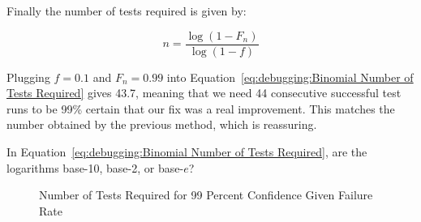 Finally the number of tests required is given by:

\begin{equation}
	n = \frac{\log\left(1 - F_n\right)}{\log\left(1 - f\right)}
\label{eq:debugging:Binomial Number of Tests Required}
\end{equation}

Plugging $f=0.1$ and $F_n=0.99$ into
Equation~\ref{eq:debugging:Binomial Number of Tests Required}
gives 43.7, meaning that we need 44 consecutive successful test
runs to be 99\% certain that our fix was a real improvement.
This matches the number obtained by the previous method, which
is reassuring.

\QuickQuiz{}
	In Equation~\ref{eq:debugging:Binomial Number of Tests Required},
	are the logarithms base-10, base-2, or base-$e$?
 \QuickQuizEnd

\begin{figure}[tb]
\centering
{}
\caption{Number of Tests Required for 99 Percent Confidence Given Failure Rate}
\label{fig:debugging:Number of Tests Required for 99 Percent Confidence Given Failure Rate}
\end{figure}

